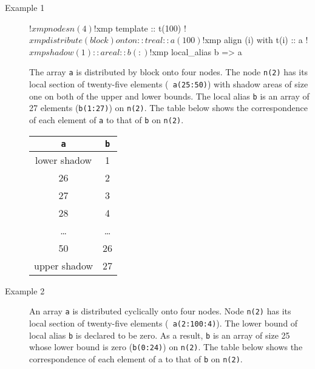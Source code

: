 \begin{description}

\item[Example 1]
\hspace{\hsize}

\begin{XFexample}
!$xmp nodes n(4)
!$xmp template :: t(100)
!$xmp distribute (block) onto n :: t

      real :: a(100)
!$xmp align (i) with t(i) :: a
!$xmp shadow (1) :: a

      real :: b(:)
!$xmp local_alias b => a
\end{XFexample}

The array {\tt a} is distributed by block onto four nodes.
The node {\tt n(2)} has its local section of twenty-five elements ({\tt
a(25:50)}) with shadow areas of size one on both of the upper and lower 
bounds. The local alias {\tt b} is an array of 27 elements
({\tt b(1:27)}) on {\tt n(2)}. The table below shows the correspondence
of each element of {\tt a} to that of {\tt b} on {\tt n(2)}.

\begin{center}
\begin{tabular}{|c|c|}\hline
{\tt a}      & {\tt b} \\ \hline\hline
lower shadow & 1       \\ \hline
26           & 2       \\ \hline
27           & 3       \\ \hline
28           & 4       \\ \hline
\dots        & \dots   \\ \hline
50           & 26      \\ \hline
upper shadow & 27      \\ \hline
\end{tabular}
\end{center}

\item[Example 2]
\hspace{\hsize}

An array {\tt a} is distributed cyclically onto four nodes.
Node {\tt n(2)} has its local section of twenty-five elements ({\tt
a(2:100:4)}).
The lower bound of local alias {\tt b} is declared to
be zero. As a result, {\tt b} is an array of size 25 whose lower
bound is zero ({\tt b(0:24)}) on {\tt n(2)}. The table below shows the
correspondence of each element of a to that of {\tt b} on {\tt n(2)}.


\end{description}
